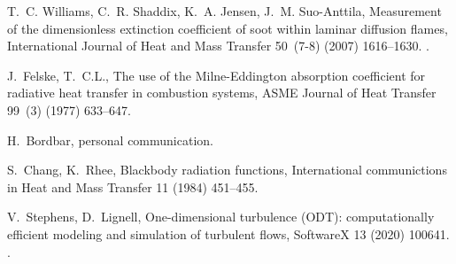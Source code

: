 \documentclass[preprint,12pt]{elsarticle}
\begin{document}
\begin{thebibliography}{10}
T.~C. Williams, C.~R. Shaddix, K.~A. Jensen, J.~M. Suo-Anttila, Measurement of
  the dimensionless extinction coefficient of soot within laminar diffusion
  flames, International Journal of Heat and Mass Transfer 50~(7-8) (2007)
  1616--1630.
\newblock \href {http://dx.doi.org/10.1016/j.ijheatmasstransfer.2006.08.024}
  {}.

J.~Felske, T.~C.L., The use of the {M}ilne-{E}ddington absorption coefficient
  for radiative heat transfer in combustion systems, ASME Journal of Heat
  Transfer 99~(3) (1977) 633--647.

H.~Bordbar, personal communication.

S.~Chang, K.~Rhee, Blackbody radiation functions, International communictions
  in Heat and Mass Transfer 11 (1984) 451--455.

V.~Stephens, D.~Lignell, One-dimensional turbulence ({ODT}): computationally
  efficient modeling and simulation of turbulent flows, Software{X} 13 (2020)
  100641.
\newblock \href {http://dx.doi.org/10.1016/j.softx.2020.100641}
  {}.

\end{thebibliography}

\end{document}
